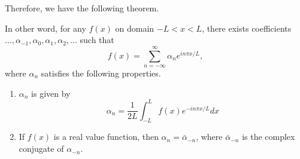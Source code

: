Therefore, we have the following theorem.
\begin{theorem}[]
    In other word, for any $f(x)$ on domain $-L<x<L$, there exists coefficients $\dots, \alpha_{-1}, \alpha_0, \alpha_1, \alpha_2, \dots$ such that 
    \begin{equation}\label{eq.fourier_complex}
        f(x)=\sum_{n=-\infty}^{\infty} \alpha_n e^{i n \pi x / L},
    \end{equation}
    where $\alpha_n$ satisfies the following properties.
    \begin{enumerate}
        \item $\alpha_n$ is given by 
        \begin{equation}\label{eq.fourier_complex_coefficients}
            \alpha_n=\frac{1}{2 L} \int_{-L}^L f(x) e^{-i n \pi x / L} d x
        \end{equation}
        \item If $f(x)$ is a real value function, then $\alpha_n = \bar{\alpha}_{-n}$, where $\bar{\alpha}_{-n}$ is the complex conjugate of $\alpha_{-n}$.
    \end{enumerate}
\end{theorem}
